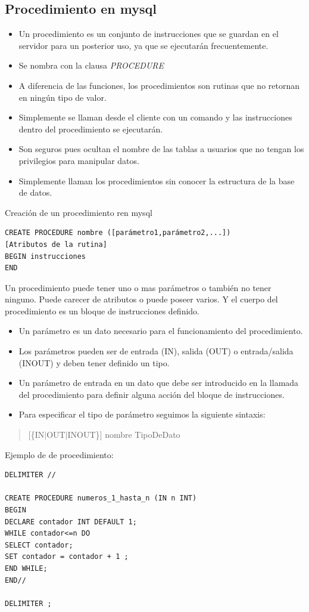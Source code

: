 \documentclass[4paper]{article}
\newcommand{\M}{mysql}
\begin{document}
\subsection{Procedimiento en \M}
\begin{itemize}
\item Un procedimiento es un conjunto de instrucciones que se guardan en el servidor para un posterior uso, ya que se ejecutarán frecuentemente.
\item Se nombra con la clausa \emph{PROCEDURE}
\item A diferencia de las funciones, los procedimientos son rutinas que no retornan en ningún tipo de valor.
\item Simplemente se llaman desde el cliente con un comando y las instrucciones dentro del procedimiento se ejecutarán.
\item Son seguros pues ocultan el nombre de las tablas a usuarios que no tengan los privilegios para manipular datos.
\item Simplemente llaman los procedimientos sin conocer la estructura de la base de datos.
\end{itemize}
Creación de un procedimiento ren \M
\begin{verbatim}
CREATE PROCEDURE nombre ([parámetro1,parámetro2,...])
[Atributos de la rutina]
BEGIN instrucciones
END
\end{verbatim}
Un procedimiento puede tener uno o mas parámetros o también no tener ninguno. Puede carecer de atributos o puede poseer varios. Y el cuerpo del procedimiento es un bloque de instrucciones definido.
\begin{itemize}
\item Un parámetro es un dato necesario para el funcionamiento del procedimiento.
\item Los parámetros pueden ser de entrada (IN), salida (OUT) o entrada/salida (INOUT) y deben tener definido un tipo.
\item Un parámetro de entrada en un dato que debe ser introducido en la llamada del procedimiento para definir alguna acción del bloque de instrucciones.
\item Para especificar el tipo de parámetro seguimos la siguiente sintaxis:
\end{itemize}
\begin{quote}
[\{IN$|$OUT$|$INOUT\}] nombre TipoDeDato
\end{quote}
\newpage
Ejemplo de de procedimiento:
\begin{verbatim}
DELIMITER //

CREATE PROCEDURE numeros_1_hasta_n (IN n INT)
BEGIN
DECLARE contador INT DEFAULT 1;
WHILE contador<=n DO
SELECT contador;
SET contador = contador + 1 ;
END WHILE;
END//

DELIMITER ;
\end{verbatim}
\end{document}
